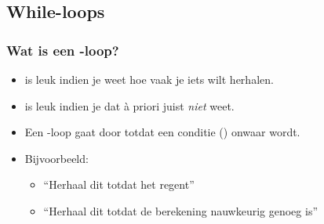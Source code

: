 \subsection{While-loops}


\begin{frame}
\frametitle{Wat is een -loop?}

\begin{itemize}
  \item<1->  is leuk indien je weet hoe vaak je iets wilt herhalen.
  \item<2->  is leuk indien je dat \`a priori juist \emph{niet} weet.
  \item<3-> Een -loop gaat door totdat een conditie () onwaar wordt.
  \item<4-> Bijvoorbeeld:
  \begin{itemize}
    \item<5-> ``Herhaal dit totdat het regent''
    \item<6-> ``Herhaal dit totdat de berekening nauwkeurig genoeg is''
  \end{itemize}
\end{itemize}

\end{frame}





